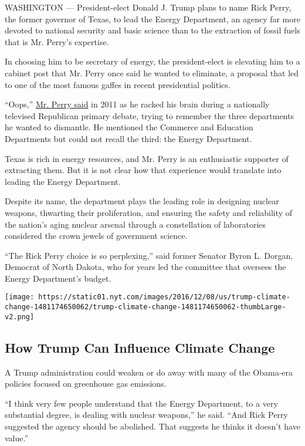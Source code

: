 WASHINGTON --- President-elect Donald J. Trump plans to name Rick Perry,
the former governor of Texas, to lead the Energy Department, an agency
far more devoted to national security and basic science than to the
extraction of fossil fuels that is Mr. Perry's expertise.

In choosing him to be secretary of energy, the president-elect is
elevating him to a cabinet post that Mr. Perry once said he wanted to
eliminate, a proposal that led to one of the most famous gaffes in
recent presidential politics.

``Oops,'' \href{https://www.youtube.com/watch?v=0uvmKnFY4uk}{Mr. Perry
said} in 2011 as he racked his brain during a nationally televised
Republican primary debate, trying to remember the three departments he
wanted to dismantle. He mentioned the Commerce and Education Departments
but could not recall the third: the Energy Department.

Texas is rich in energy resources, and Mr. Perry is an enthusiastic
supporter of extracting them. But it is not clear how that experience
would translate into leading the Energy Department.

Despite its name, the department plays the leading role in designing
nuclear weapons, thwarting their proliferation, and ensuring the safety
and reliability of the nation's aging nuclear arsenal through a
constellation of laboratories considered the crown jewels of government
science.

``The Rick Perry choice is so perplexing,'' said former Senator Byron L.
Dorgan, Democrat of North Dakota, who for years led the committee that
oversees the Energy Department's budget.

\href{https://www.nytimes.com/interactive/2016/12/08/us/trump-climate-change.html}{}

\texttt{[image: https://static01.nyt.com/images/2016/12/08/us/trump-climate-change-1481174650062/trump-climate-change-1481174650062-thumbLarge-v2.png]}

\hypertarget{how-trump-can-influence-climate-change}{%
\subsection{How Trump Can Influence Climate
Change}\label{how-trump-can-influence-climate-change}}

A Trump administration could weaken or do away with many of the
Obama-era policies focused on greenhouse gas emissions.

``I think very few people understand that the Energy Department, to a
very substantial degree, is dealing with nuclear weapons,'' he said.
``And Rick Perry suggested the agency should be abolished. That suggests
he thinks it doesn't have value.''


